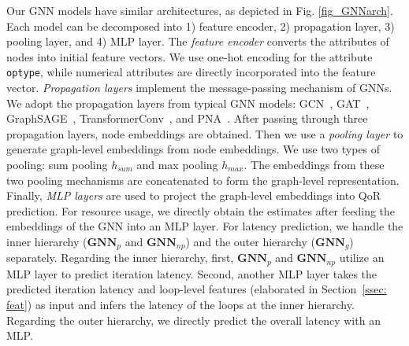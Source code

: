 \documentclass[conference]{IEEEtran}
\begin{document}
Our GNN models have similar architectures, as depicted in Fig. \ref{fig_GNNarch}. Each model can be decomposed into 1) feature encoder, 2) propagation layer, 3) pooling layer, and 4) MLP layer.  The \textit{feature encoder} converts the attributes of nodes into initial feature vectors. We use one-hot encoding for the attribute \verb|optype|, while numerical attributes are directly incorporated into the feature vector. \textit{Propagation layers} implement the message-passing mechanism of GNNs. We adopt the propagation layers from typical GNN models: GCN~\cite{kipf2017semi}, GAT~\cite{velickovic2018graph}, GraphSAGE~\cite{hamilton2017inductive}, TransformerConv~\cite{shi2020masked}, and PNA~\cite{Corso2020PrincipalNA}.
After passing through three propagation layers, node embeddings are obtained. 
Then we use a \textit{pooling layer} to generate graph-level embeddings from node embeddings. We use two types of pooling: sum pooling \(h_{sum}\) and max pooling \(h_{max}\). The embeddings from these two pooling mechanisms are concatenated to form the graph-level representation.
Finally, \textit{MLP layers} are used to project the graph-level embeddings into QoR prediction. For resource usage, we directly obtain the estimates after feeding the embeddings of the GNN into an MLP layer. For latency prediction, we handle the inner hierarchy ($\textbf{GNN}_p$ and $\textbf{GNN}_{np}$) and the outer hierarchy ($\textbf{GNN}_{g}$) separately. Regarding the inner hierarchy, first, $\textbf{GNN}_p$ and $\textbf{GNN}_{np}$ utilize an MLP layer to predict iteration latency. Second, another MLP layer takes the predicted iteration latency and loop-level features (elaborated in Section~\ref{ssec: feat}) as input and infers the latency of the loops at the inner hierarchy. Regarding the outer hierarchy, we directly predict the overall latency with an MLP.




\end{document}
